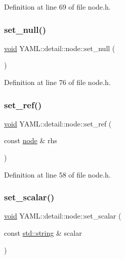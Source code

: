 Definition at line 69 of file node.\+h.

\mbox{\label{class_y_a_m_l_1_1detail_1_1node_a056afeb414a11af75f8a440147e3b78a}} 
\subsubsection{\texorpdfstring{set\_null()}{set\_null()}}
{\footnotesize\ttfamily \mbox{\hyperlink{glad_8h_a950fc91edb4504f62f1c577bf4727c29}{void}} Y\+A\+M\+L\+::detail\+::node\+::set\+\_\+null (\begin{DoxyParamCaption}{ }\end{DoxyParamCaption})\hspace{0.3cm}{\ttfamily [inline]}}



Definition at line 76 of file node.\+h.

\mbox{\label{class_y_a_m_l_1_1detail_1_1node_af18f7978073e65e45fa9cb094ae1b882}} 
\subsubsection{\texorpdfstring{set\_ref()}{set\_ref()}}
{\footnotesize\ttfamily \mbox{\hyperlink{glad_8h_a950fc91edb4504f62f1c577bf4727c29}{void}} Y\+A\+M\+L\+::detail\+::node\+::set\+\_\+ref (\begin{DoxyParamCaption}\item[{const \mbox{\hyperlink{class_y_a_m_l_1_1detail_1_1node}{node}} \&}]{rhs }\end{DoxyParamCaption})\hspace{0.3cm}{\ttfamily [inline]}}



Definition at line 58 of file node.\+h.

\mbox{\label{class_y_a_m_l_1_1detail_1_1node_aacde9a661dc94e3a699f84b975f1306a}} 
\subsubsection{\texorpdfstring{set\_scalar()}{set\_scalar()}}
{\footnotesize\ttfamily \mbox{\hyperlink{glad_8h_a950fc91edb4504f62f1c577bf4727c29}{void}} Y\+A\+M\+L\+::detail\+::node\+::set\+\_\+scalar (\begin{DoxyParamCaption}\item[{const \mbox{\hyperlink{glad_8h_ac83513893df92266f79a515488701770}{std\+::string}} \&}]{scalar }\end{DoxyParamCaption})\hspace{0.3cm}{\ttfamily [inline]}}



